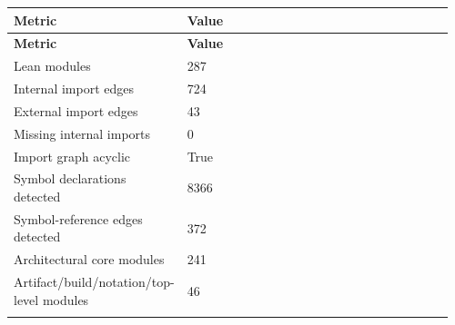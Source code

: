 \small
{}
\begin{longtable}{L{0.26\linewidth} L{0.7\linewidth}}
\hline
\textbf{Metric} & \textbf{Value}\\
\hline
\endfirsthead
\hline
\textbf{Metric} & \textbf{Value}\\
\hline
\endhead
Lean modules & 287\\
\hline
\addlinespace[0.24em]
Internal import edges & 724\\
\hline
\addlinespace[0.24em]
External import edges & 43\\
\hline
\addlinespace[0.24em]
Missing internal imports & 0\\
\hline
\addlinespace[0.24em]
Import graph acyclic & True\\
\hline
\addlinespace[0.24em]
Symbol declarations detected & 8366\\
\hline
\addlinespace[0.24em]
Symbol-reference edges detected & 372\\
\hline
\addlinespace[0.24em]
Architectural core modules & 241\\
\hline
\addlinespace[0.24em]
Artifact/\allowbreak{}build/\allowbreak{}notation/\allowbreak{}top-level modules & 46\\
\hline
\addlinespace[0.24em]
\end{longtable}
\normalsize
